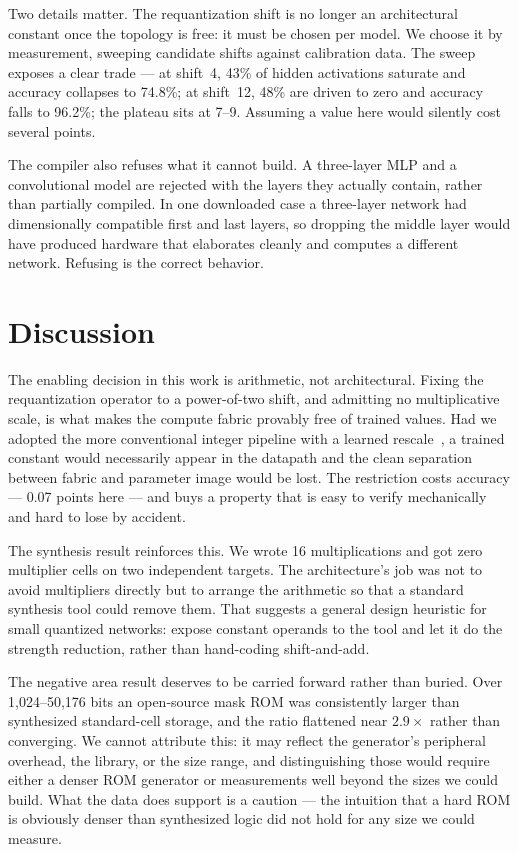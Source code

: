\documentclass[conference]{IEEEtran}
\begin{document}
Two details matter. The requantization shift is no longer an architectural
constant once the topology is free: it must be chosen per model. We choose it
by measurement, sweeping candidate shifts against calibration data. The sweep
exposes a clear trade --- at shift~4, 43\% of hidden activations saturate and
accuracy collapses to 74.8\%; at shift~12, 48\% are driven to zero and accuracy
falls to 96.2\%; the plateau sits at 7--9. Assuming a value here would silently
cost several points.

The compiler also refuses what it cannot build. A three-layer MLP and a
convolutional model are rejected with the layers they actually contain, rather
than partially compiled. In one downloaded case a three-layer network had
dimensionally compatible first and last layers, so dropping the middle layer
would have produced hardware that elaborates cleanly and computes a different
network. Refusing is the correct behavior.

\section{Discussion}

The enabling decision in this work is arithmetic, not architectural. Fixing the
requantization operator to a power-of-two shift, and admitting no multiplicative
scale, is what makes the compute fabric provably free of trained values. Had we
adopted the more conventional integer pipeline with a learned
rescale~\cite{jacob}, a trained constant would necessarily appear in the
datapath and the clean separation between fabric and parameter image would be
lost. The restriction costs accuracy --- 0.07 points here --- and buys a
property that is easy to verify mechanically and hard to lose by accident.

The synthesis result reinforces this. We wrote 16 multiplications and got zero
multiplier cells on two independent targets. The architecture's job was not to
avoid multipliers directly but to arrange the arithmetic so that a standard
synthesis tool could remove them. That suggests a general design heuristic for
small quantized networks: expose constant operands to the tool and let it do
the strength reduction, rather than hand-coding shift-and-add.

The negative area result deserves to be carried forward rather than buried.
Over 1{,}024--50{,}176 bits an open-source mask ROM was consistently larger than
synthesized standard-cell storage, and the ratio flattened near $2.9\times$
rather than converging. We cannot attribute this: it may reflect the generator's
peripheral overhead, the library, or the size range, and distinguishing those
would require either a denser ROM generator or measurements well beyond the
sizes we could build. What the data does support is a caution --- the intuition
that a hard ROM is obviously denser than synthesized logic did not hold for any
size we could measure.
\end{document}
